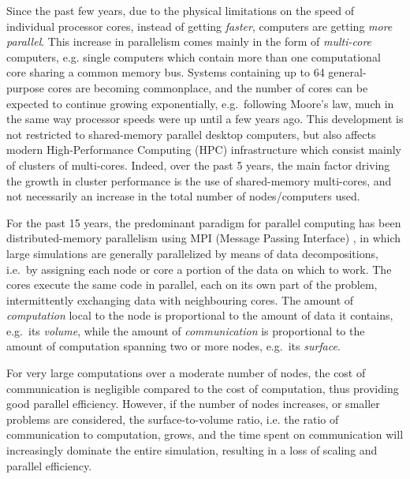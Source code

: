 \documentclass[final]{siamltex}
\begin{document}
Since the past few years, due to the physical limitations
on the speed of individual processor cores, instead of
getting {\em faster}, computers are getting {\em more parallel}.
This increase in parallelism comes mainly in the form of
{\em multi-core} computers, e.g. single computers which
contain more than one computational core sharing a common 
memory bus.
Systems containing up to 64 general-purpose cores are becoming
commonplace, and the number of cores can be expected to continue
growing exponentially, e.g.~following Moore's law, much in the
same way processor speeds were up until a few years ago.
This development is not restricted to shared-memory parallel desktop
computers, but also affects modern High-Performance Computing (HPC)
infrastructure which consist mainly of clusters of multi-cores.
Indeed, over the past 5 years, the main factor driving the growth
in cluster performance is the use of shared-memory multi-cores,
and not necessarily an increase in the total number of
nodes/computers used.

For the past 15 years, the predominant paradigm for parallel
computing has been distributed-memory parallelism using MPI
(Message Passing Interface) \cite{ref:Snir1998},
in which large simulations are generally
parallelized by means of data decompositions, i.e.~by assigning
each node or core a portion of the data on which to work.
The cores execute the same code
in parallel, each on its own part of the problem, intermittently exchanging
data with neighbouring cores.
The amount of {\em computation} local to the node is proportional
to the amount of data it contains, e.g.~its {\em volume}, while
the amount of {\em communication} is proportional to the
amount of computation spanning two or more nodes, e.g.~its
{\em surface}.

For very large computations over a moderate number of nodes,
the cost of communication is negligible compared to the
cost of computation, thus providing good parallel efficiency.
However, if the number of nodes increases, or 
smaller problems are considered, the surface-to-volume ratio,
i.e. the ratio of communication to computation,
grows, and the time spent on communication will increasingly
dominate the entire simulation, resulting in a loss of scaling
and parallel efficiency.

\end{document}
